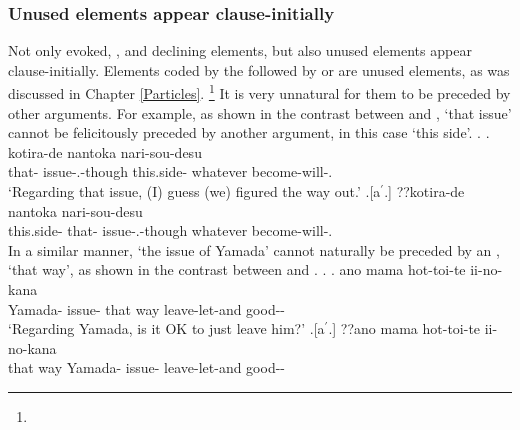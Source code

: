\subsubsection{Unused elements appear clause-initially}\label{WO:ClauseInit:Ident:ActStatus}

Not only evoked, , and declining elements,
but also unused elements appear clause-initially.
Elements coded by the  followed by  or  are unused elements, as was discussed in Chapter \ref{Particles}.%
 \footnote{
 }
It is very unnatural for them to be preceded by other arguments.
For example,
as shown in the contrast between \Next[a] and \Next[b],
 `that issue' cannot be felicitously preceded by another argument, in this case  `this side'.
%
\ex.
 \ag.   kotira-de nantoka nari-sou-desu \\
      that- issue-.-though this.side- whatever become-will-. \\
      `Regarding that issue, (I) guess (we) figured the way out.'
      \hfill{\cite[modified from][283]{niwa06}}
 \bg.[a$^{\prime}$.] ??kotira-de   nantoka nari-sou-desu \\
      this.side- that- issue-.-though whatever become-will-. \\

\largerpage
In a similar manner,
 `the issue of Yamada' cannot naturally be preceded by an ,  `that way',
as shown in the contrast between \Next[a] and \Next[b].
%
\ex.
 \ag.   ano mama hot-toi-te ii-no-kana \\
      Yamada- issue- that way leave-let-and good-- \\
      `Regarding Yamada, is it OK to just leave him?'
      \hfill{\cite[283]{niwa06}}
 \bg.[a$^{\prime}$.] ??ano mama   hot-toi-te ii-no-kana \\
      that way Yamada- issue- leave-let-and good-- \\


